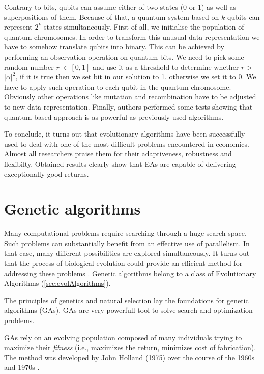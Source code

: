 Contrary to bits, qubits can assume either of two states (0 or 1) as well as superpositions of them.
Because of that, a quantum system based on $k$ qubits can represent $2^{k}$ states simultaneously.
First of all, we initialise the population of quantum chromosomes.
In order to transform this unusual data representation we have to somehow translate qubits into binary.
This can be achieved by performing an observation operation on quantum bits.
We need to pick some random number $r$ $\in [0,1]$ and use it as a threshold to determine whether $r$ > $|\alpha|^2$, if it is true then we set bit in our solution
 to 1, otherwise we set it to 0.
We have to apply such operation to each qubit in the quantum chromosome.
Obviously other operations like mutation and recombination have to be adjusted to new data representation.
Finally, authors performed some tests showing that quantum based approach is as powerful as previously used algorithms.
  

To conclude, it turns out that evolutionary algorithms have been successfully used to deal with one of the most difficult problems encountered in economics.
Almost all researchers praise them for their adaptiveness, robustness and flexibilty.
Obtained results clearly show that EAs are capable of delivering exceptionally good returns.      


\section{Genetic algorithms}
\label{sec:genAlgorithms}

Many computational problems require searching through a huge search space.
Such problems can substantially benefit from an effective use of parallelism.
In that case, many different possibilities are explored simultaneously. 
It turns out that the process of biological evolution could provide an efficient method for addressing these problems \cite{Mitchell01}.
Genetic algorithms belong to a class of Evolutionary Algorithms (\ref{sec:evolAlgorithms}).


The principles of genetics and natural selection lay the foundations for genetic algorithms (GAs).
GAs are very powerfull tool to solve search and optimization problems.

GAs rely on an evolving population composed of many individuals trying to maximize their \emph{fitness} (i.e., maximizes the return, minimizes cost of fabrication).  
The method was developed by John Holland (1975) over the course of the 1960s and 1970s \cite{Haupt:2004:PGA:1007746}.

